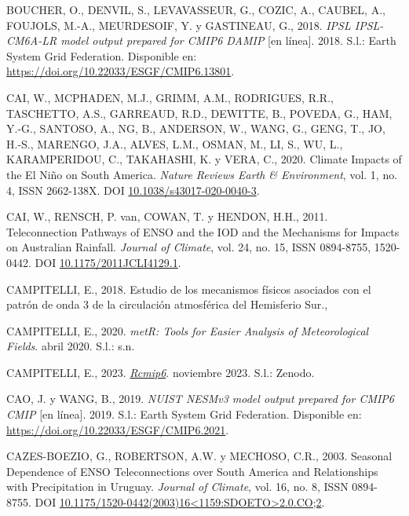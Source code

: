 \documentclass[12pt,oneside,a4paper]{reedthesis}
\newlength{\cslhangindent}
\newenvironment{CSLReferences}[2] %
 {%
  \setlength{\parindent}{0pt}
  \ifodd #1 \everypar{\setlength{\hangindent}{\cslhangindent}}\ignorespaces\fi
  \ifnum #2 > 0
  \setlength{\parskip}{#2\baselineskip}
  \fi
 }%
 {}
\begin{document}
\begin{CSLReferences}{1}{0}
\leavevmode{}%
BOUCHER, O., DENVIL, S., LEVAVASSEUR, G., COZIC, A., CAUBEL, A., FOUJOLS, M.-A., MEURDESOIF, Y. y GASTINEAU, G., 2018. \emph{IPSL IPSL-CM6A-LR model output prepared for CMIP6 DAMIP} {[}en línea{]}. 2018. S.l.: Earth System Grid Federation. Disponible en: \url{https://doi.org/10.22033/ESGF/CMIP6.13801}.

\leavevmode{}%
CAI, W., MCPHADEN, M.J., GRIMM, A.M., RODRIGUES, R.R., TASCHETTO, A.S., GARREAUD, R.D., DEWITTE, B., POVEDA, G., HAM, Y.-G., SANTOSO, A., NG, B., ANDERSON, W., WANG, G., GENG, T., JO, H.-S., MARENGO, J.A., ALVES, L.M., OSMAN, M., LI, S., WU, L., KARAMPERIDOU, C., TAKAHASHI, K. y VERA, C., 2020. Climate Impacts of the {El Niño} on {South America}. \emph{Nature Reviews Earth \& Environment}, vol. 1, no. 4, ISSN 2662-138X. DOI \href{https://doi.org/10.1038/s43017-020-0040-3}{10.1038/s43017-020-0040-3}.

\leavevmode{}%
CAI, W., RENSCH, P. van, COWAN, T. y HENDON, H.H., 2011. Teleconnection {Pathways} of {ENSO} and the {IOD} and the {Mechanisms} for {Impacts} on {Australian Rainfall}. \emph{Journal of Climate}, vol. 24, no. 15, ISSN 0894-8755, 1520-0442. DOI \href{https://doi.org/10.1175/2011JCLI4129.1}{10.1175/2011JCLI4129.1}.

\leavevmode{}%
CAMPITELLI, E., 2018. {Estudio de los mecanismos físicos asociados con el patrón de onda 3 de la circulación atmosférica del Hemisferio Sur}.,

\leavevmode{}%
CAMPITELLI, E., 2020. \emph{{metR}: {Tools} for {Easier Analysis} of {Meteorological Fields}}. abril 2020. S.l.: s.n.

\leavevmode{}%
CAMPITELLI, E., 2023. \emph{\href{https://doi.org/10.5281/zenodo.10138834}{Rcmip6}}. noviembre 2023. S.l.: Zenodo.

\leavevmode{}%
CAO, J. y WANG, B., 2019. \emph{NUIST NESMv3 model output prepared for CMIP6 CMIP} {[}en línea{]}. 2019. S.l.: Earth System Grid Federation. Disponible en: \url{https://doi.org/10.22033/ESGF/CMIP6.2021}.

\leavevmode{}%
CAZES-BOEZIO, G., ROBERTSON, A.W. y MECHOSO, C.R., 2003. Seasonal {Dependence} of {ENSO Teleconnections} over {South America} and {Relationships} with {Precipitation} in {Uruguay}. \emph{Journal of Climate}, vol. 16, no. 8, ISSN 0894-8755. DOI \href{https://doi.org/10.1175/1520-0442(2003)16\%3C1159:SDOETO\%3E2.0.CO;2}{10.1175/1520-0442(2003)16\textless1159:SDOETO\textgreater2.0.CO;2}.


\end{CSLReferences}
\end{document}
